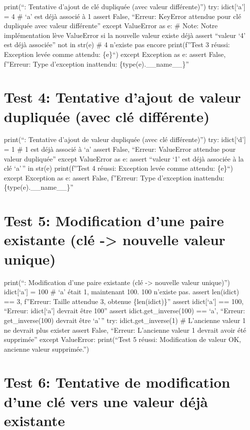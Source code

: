 \documentclass[12pt,a4paper]{report}
\begin{document}
print(``: Tentative d'ajout de clé dupliquée (avec valeur
différente)'') try: idict{[}`a'{]} = 4 \# `a' est déjà associé à 1
assert False, ``Erreur: KeyError attendue pour clé dupliquée avec valeur
différente'' except ValueError as e: \# Note: Notre implémentation lève
ValueError si la nouvelle valeur existe déjà assert ``valeur `4' est
déjà associée'' not in str(e) \# 4 n'existe pas encore print(f''Test 3
réussi: Exception levée comme attendu: \{e\}``) except Exception as e:
assert False, f''Erreur: Type d'exception inattendu:
\{type(e).\_\_name\_\_\}''

\section{Test 4: Tentative d'ajout de valeur dupliquée (avec clé
différente)}\label{test-4-tentative-dajout-de-valeur-dupliquuxe9e-avec-cluxe9-diffuxe9rente}

print(``: Tentative d'ajout de valeur dupliquée (avec clé
différente)'') try: idict{[}`d'{]} = 1 \# 1 est déjà associé à `a'
assert False, ``Erreur: ValueError attendue pour valeur dupliquée''
except ValueError as e: assert ``valeur `1' est déjà associée à la clé
`a'\,'' in str(e) print(f''Test 4 réussi: Exception levée comme attendu:
\{e\}``) except Exception as e: assert False, f''Erreur: Type
d'exception inattendu: \{type(e).\_\_name\_\_\}''

\section{Test 5: Modification d'une paire existante (clé -\textgreater{}
nouvelle valeur
unique)}\label{test-5-modification-dune-paire-existante-cluxe9---nouvelle-valeur-unique}

print(``: Modification d'une paire existante (clé
-\textgreater{} nouvelle valeur unique)'') idict{[}`a'{]} = 100 \# `a'
était 1, maintenant 100. 100 n'existe pas. assert len(idict) == 3,
f''Erreur: Taille attendue 3, obtenue \{len(idict)\}'' assert
idict{[}`a'{]} == 100, ``Erreur: idict{[}`a'{]} devrait être 100''
assert idict.get\_inverse(100) == `a', ``Erreur: get\_inverse(100)
devrait être `a'\,'' try: idict.get\_inverse(1) \# L'ancienne valeur 1
ne devrait plus exister assert False, ``Erreur: L'ancienne valeur 1
devrait avoir été supprimée'' except ValueError: print(``Test 5 réussi:
Modification de valeur OK, ancienne valeur supprimée.'')

\section{Test 6: Tentative de modification d'une clé vers une valeur
déjà
existante}\label{test-6-tentative-de-modification-dune-cluxe9-vers-une-valeur-duxe9juxe0-existante}
\end{document}
